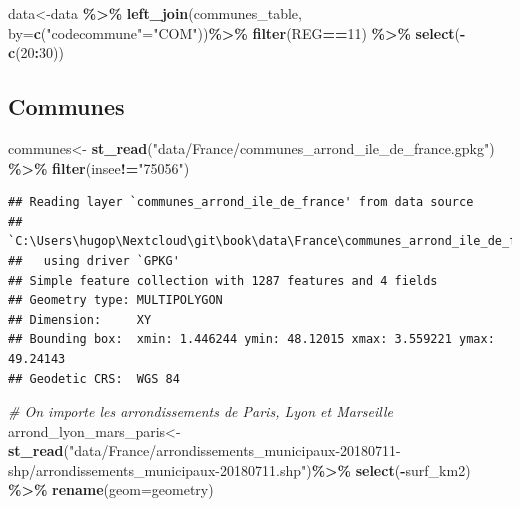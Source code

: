 \documentclass[
]{book}
\newenvironment{Shaded}{\begin{snugshade}}{\end{snugshade}}
\newcommand{\AttributeTok}[1]{\textcolor[rgb]{0.13,0.29,0.53}{#1}}
\newcommand{\CommentTok}[1]{\textcolor[rgb]{0.56,0.35,0.01}{\textit{#1}}}
\newcommand{\DecValTok}[1]{\textcolor[rgb]{0.00,0.00,0.81}{#1}}
\newcommand{\FunctionTok}[1]{\textcolor[rgb]{0.13,0.29,0.53}{\textbf{#1}}}
\newcommand{\NormalTok}[1]{#1}
\newcommand{\OtherTok}[1]{\textcolor[rgb]{0.56,0.35,0.01}{#1}}
\newcommand{\SpecialCharTok}[1]{\textcolor[rgb]{0.81,0.36,0.00}{\textbf{#1}}}
\newcommand{\StringTok}[1]{\textcolor[rgb]{0.31,0.60,0.02}{#1}}
\begin{document}
\begin{Shaded}
\begin{Highlighting}[]
\NormalTok{data}\OtherTok{\textless{}{-}}\NormalTok{data }\SpecialCharTok{\%\textgreater{}\%}
  \FunctionTok{left\_join}\NormalTok{(communes\_table, }\AttributeTok{by=}\FunctionTok{c}\NormalTok{(}\StringTok{"codecommune"}\OtherTok{=}\StringTok{"COM"}\NormalTok{))}\SpecialCharTok{\%\textgreater{}\%}
  \FunctionTok{filter}\NormalTok{(REG}\SpecialCharTok{==}\DecValTok{11}\NormalTok{) }\SpecialCharTok{\%\textgreater{}\%}
  \FunctionTok{select}\NormalTok{(}\SpecialCharTok{{-}}\FunctionTok{c}\NormalTok{(}\DecValTok{20}\SpecialCharTok{:}\DecValTok{30}\NormalTok{))}
\end{Highlighting}
\end{Shaded}

\hypertarget{communes}{%
\subsection{Communes}\label{communes}}

\begin{Shaded}
\begin{Highlighting}[]
\NormalTok{communes}\OtherTok{\textless{}{-}} \FunctionTok{st\_read}\NormalTok{(}\StringTok{"data/France/communes\_arrond\_ile\_de\_france.gpkg"}\NormalTok{) }\SpecialCharTok{\%\textgreater{}\%}
  \FunctionTok{filter}\NormalTok{(insee}\SpecialCharTok{!=}\StringTok{"75056"}\NormalTok{)}
\end{Highlighting}
\end{Shaded}

\begin{verbatim}
## Reading layer `communes_arrond_ile_de_france' from data source 
##   `C:\Users\hugop\Nextcloud\git\book\data\France\communes_arrond_ile_de_france.gpkg' 
##   using driver `GPKG'
## Simple feature collection with 1287 features and 4 fields
## Geometry type: MULTIPOLYGON
## Dimension:     XY
## Bounding box:  xmin: 1.446244 ymin: 48.12015 xmax: 3.559221 ymax: 49.24143
## Geodetic CRS:  WGS 84
\end{verbatim}

\begin{Shaded}
\begin{Highlighting}[]
\CommentTok{\# On importe les arrondissements de Paris, Lyon et Marseille}
\NormalTok{arrond\_lyon\_mars\_paris}\OtherTok{\textless{}{-}} \FunctionTok{st\_read}\NormalTok{(}\StringTok{"data/France/arrondissements\_municipaux{-}20180711{-}shp/arrondissements\_municipaux{-}20180711.shp"}\NormalTok{)}\SpecialCharTok{\%\textgreater{}\%}
  \FunctionTok{select}\NormalTok{(}\SpecialCharTok{{-}}\NormalTok{surf\_km2) }\SpecialCharTok{\%\textgreater{}\%} 
  \FunctionTok{rename}\NormalTok{(}\AttributeTok{geom=}\NormalTok{geometry)}
\end{Highlighting}
\end{Shaded}
\end{document}
